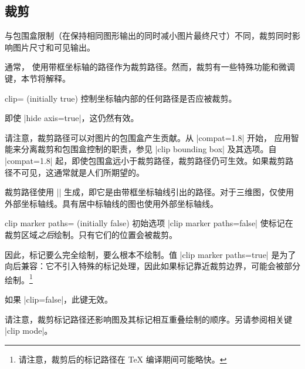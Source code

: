 \subsection{裁剪}
\label{sec:clipping}

与包围盒限制（在保持相同图形输出的同时减小图片最终尺寸）不同，裁剪同时影响图片尺寸和可见输出。

通常，\PGFPlots{} 使用带框坐标轴的路径作为裁剪路径。然而，裁剪有一些特殊功能和微调键，本节将解释。

\begin{pgfplotskey}{clip= (initially true)}
    控制坐标轴内部的任何路径是否应被裁剪。

    即使 |hide axis=true|，这仍然有效。

    请注意，裁剪路径可以对图片的包围盒产生贡献。从 |compat=1.8| 开始，\PGFPlots{} 应用智能来分离裁剪和包围盒控制的职责，参见 |clip bounding box| 及其选项。自 |compat=1.8| 起，即使包围盒远小于裁剪路径，裁剪路径仍可生效。如果裁剪路径不可见，这通常就是人们所期望的。

    裁剪路径使用 |\pgfplotspathaxisoutline| 生成，即它是由带框坐标轴线引出的路径。对于三维图，仅使用外部坐标轴线。具有居中标轴线的图也使用外部坐标轴线。
\end{pgfplotskey}

\begin{pgfplotskey}{clip marker paths= (initially false)}
    初始选项 |clip marker paths=false| 使标记在裁剪区域\emph{之后}绘制。只有它们的位置会被裁剪。

    因此，标记要么完全绘制，要么根本不绘制。值 |clip marker paths=true| 是为了向后兼容：它不引入特殊的标记处理，因此如果标记靠近裁剪边界，可能会被部分绘制。\footnote{请注意，裁剪后的标记路径在 \TeX{} 编译期间可能略快。}

    如果 |clip=false|，此键无效。

    请注意，裁剪标记路径还影响图及其标记相互重叠绘制的顺序。另请参阅相关键 |clip mode|。
\end{pgfplotskey}

